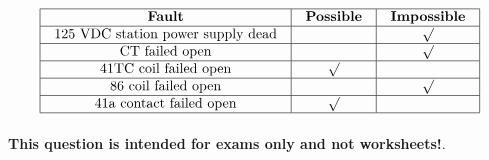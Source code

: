 






$$\vbox{\offinterlineskip
\halign{\strut
\vrule \quad\hfil # \ \hfil & 
\vrule \quad\hfil # \ \hfil & 
\vrule \quad\hfil # \ \hfil \vrule \cr
\noalign{\hrule}
%
{\bf Fault} & {\bf Possible} & {\bf Impossible} \cr
%
\noalign{\hrule}
%
125 VDC station power supply dead &  & $\surd$ \cr
%
\noalign{\hrule}
%
CT failed open &  & $\surd$ \cr
%
\noalign{\hrule}
%
41TC coil failed open & $\surd$ &  \cr
%
\noalign{\hrule}
%
86 coil failed open &  & $\surd$ \cr
%
\noalign{\hrule}
%
41a contact failed open & $\surd$ &  \cr
%
\noalign{\hrule}
} %
}$$ %







{\bf This question is intended for exams only and not worksheets!}.



